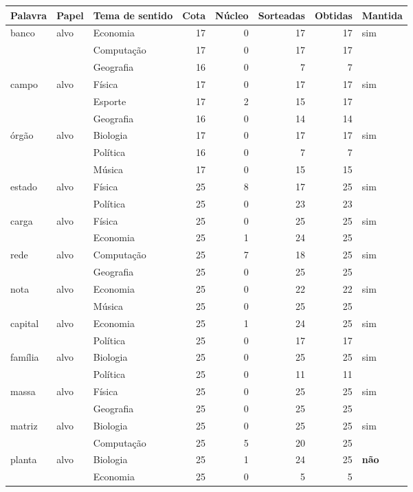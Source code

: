\footnotesize
\begin{tabular}{lllrrrrl}
\toprule
Palavra & Papel & Tema de sentido & Cota & Núcleo & Sorteadas & Obtidas & Mantida \\
\midrule
banco & alvo & Economia & 17 & 0 & 17 & 17 & sim \\
 &  & Computação & 17 & 0 & 17 & 17 &  \\
 &  & Geografia & 16 & 0 & 7 & 7 &  \\
campo & alvo & Física & 17 & 0 & 17 & 17 & sim \\
 &  & Esporte & 17 & 2 & 15 & 17 &  \\
 &  & Geografia & 16 & 0 & 14 & 14 &  \\
órgão & alvo & Biologia & 17 & 0 & 17 & 17 & sim \\
 &  & Política & 16 & 0 & 7 & 7 &  \\
 &  & Música & 17 & 0 & 15 & 15 &  \\
estado & alvo & Física & 25 & 8 & 17 & 25 & sim \\
 &  & Política & 25 & 0 & 23 & 23 &  \\
carga & alvo & Física & 25 & 0 & 25 & 25 & sim \\
 &  & Economia & 25 & 1 & 24 & 25 &  \\
rede & alvo & Computação & 25 & 7 & 18 & 25 & sim \\
 &  & Geografia & 25 & 0 & 25 & 25 &  \\
nota & alvo & Economia & 25 & 0 & 22 & 22 & sim \\
 &  & Música & 25 & 0 & 25 & 25 &  \\
capital & alvo & Economia & 25 & 1 & 24 & 25 & sim \\
 &  & Política & 25 & 0 & 17 & 17 &  \\
família & alvo & Biologia & 25 & 0 & 25 & 25 & sim \\
 &  & Política & 25 & 0 & 11 & 11 &  \\
massa & alvo & Física & 25 & 0 & 25 & 25 & sim \\
 &  & Geografia & 25 & 0 & 25 & 25 &  \\
matriz & alvo & Biologia & 25 & 0 & 25 & 25 & sim \\
 &  & Computação & 25 & 5 & 20 & 25 &  \\
planta & alvo & Biologia & 25 & 1 & 24 & 25 & \textbf{não} \\
 &  & Economia & 25 & 0 & 5 & 5 &  \\

\end{tabular}
